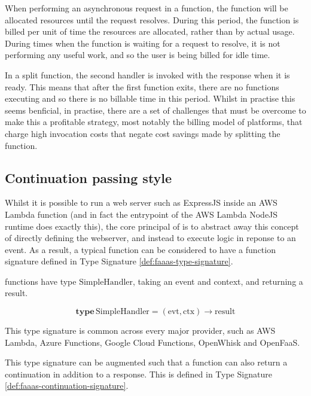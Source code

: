 When performing an asynchronous request in a function, the function will be allocated resources until the request resolves. During this period, the function is billed per unit of time the resources are allocated, rather than by actual usage. During times when the function is waiting for a request to resolve, it is not performing any useful work, and so the user is being billed for idle time.

In a split function, the second handler is invoked with the response when it is ready. This means that after the first function exits, there are no functions executing and so there is no billable time in this period. Whilst in practise this seems benficial, in practise, there are a set of challenges that must be overcome to make this a profitable strategy, most notably the billing model of \faas{} platforms, that charge high invocation costs that negate cost savings made by splitting the function.

\subsection{Continuation passing style}
\label{sec:faas-cps}
Whilst it is possible to run a web server such as ExpressJS inside an AWS Lambda function (and in fact the entrypoint of the AWS Lambda NodeJS runtime does exactly this), the core principal of \faas{} is to abstract away this concept of directly defining the webserver, and instead to execute logic in reponse to an event. As a result, a typical \faas{} function can be considered to have a function signature defined in Type Signature \ref{def:faaas-type-signature}.

\begin{signature}
\label{def:faaas-type-signature}
\faas{} functions have type $\textrm{SimpleHandler}$, taking an event and context, and returning a result.

$$\textbf{type}\, \textrm{SimpleHandler} = (\textrm{evt}, \textrm{ctx}) \rightarrow \textrm{result}$$
\end{signature}

This type signature is common across every major \faas{} provider, such as AWS Lambda\cite{amazonAWSLambda2024}, Azure Functions\cite{azureAzureFunctions2024}, Google Cloud Functions\cite{googleGoogleCloudFunctions2024}, OpenWhisk\cite{apacheOpenWhisk2024} and OpenFaaS\cite{ellisOpenFaaS2024}.

This type signature can be augmented such that a function can also return a continuation in addition to a response. This is defined in Type Signature \ref{def:faaas-continuation-signature}.

